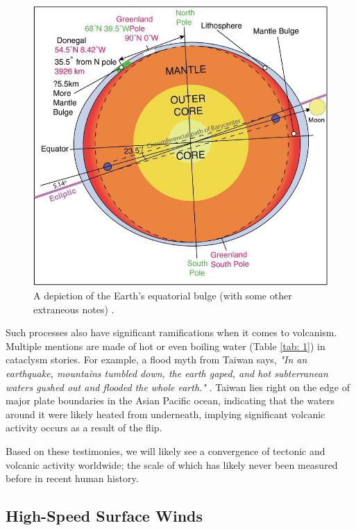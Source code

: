 \documentclass[10pt,twocolumn,letterpaper]{article}
\begin{document}
\begin{figure}[t]
\begin{center}
   \includegraphics[width=1\linewidth]{bulgecrop.png}
\end{center}
   \caption{A depiction of the Earth's equatorial bulge (with some other extraneous notes) \cite{16}.}
\label{fig:5}
\label{fig:onecol}
\end{figure}

Such processes also have significant ramifications when it comes to volcanism. Multiple mentions are made of hot or even boiling water (Table \ref{tab: 1}) in cataclysm stories. For example, a flood myth from Taiwan says, \textit{"In an earthquake, mountains tumbled down, the earth gaped, and hot subterranean waters gushed out and flooded the whole earth."} \cite{17}. Taiwan lies right on the edge of major plate boundaries in the Asian Pacific ocean, indicating that the waters around it were likely heated from underneath, implying significant volcanic activity occurs as a result of the flip.

Based on these testimonies, we will likely see a convergence of tectonic and volcanic activity worldwide; the scale of which has likely never been measured before in recent human history.

\subsection{High-Speed Surface Winds}
\end{document}
